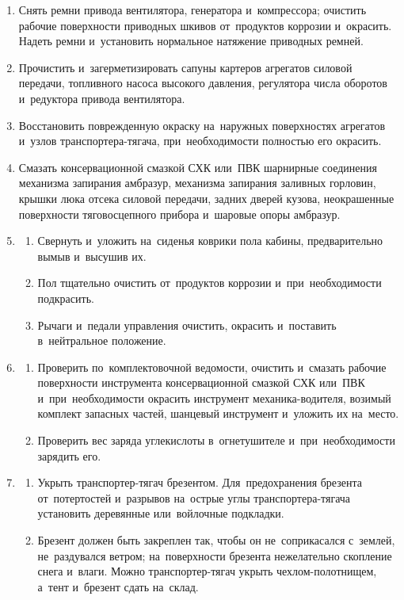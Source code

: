 \begin{enumerate}
    \item
    Снять ремни привода вентилятора, генератора и~компрессора; очистить рабочие поверхности приводных шкивов от~продуктов коррозии и~окрасить. Надеть ремни и~установить нормальное натяжение приводных ремней. 

    \item
    Прочистить и~загерметизировать сапуны картеров агрегатов силовой передачи, топливного насоса высокого давления, регулятора числа оборотов и~редуктора привода вентилятора. 

    \item
    Восстановить поврежденную окраску на~наружных поверхностях агрегатов и~узлов транспортера-тягача, при~необходимости полностью его окрасить. 

    \item
    Смазать консервационной смазкой СХК или~ПВК шарнирные соединения механизма запирания амбразур, механизма запирания заливных горловин, крышки люка отсека силовой передачи, задних дверей кузова, неокрашенные поверхности тяговосцепного прибора и~шаровые опоры амбразур. 

    \item \begin{enumerate}
        \item 
        Свернуть и~уложить на~сиденья коврики пола кабины, предварительно вымыв и~высушив их. 
        \item 
        Пол тщательно очистить от~продуктов коррозии и~при~необходимости подкрасить. 
        \item 
        Рычаги и~педали управления очистить, окрасить и~поставить в~нейтральное положение. 
    \end{enumerate}

    \item \begin{enumerate}
        \item 
        Проверить по~комплектовочной ведомости, очистить и~смазать рабочие поверхности инструмента консервационной смазкой СХК или~ПВК и~при~необходимости окрасить инструмент механика-водителя, возимый комплект запасных частей, шанцевый инструмент и~уложить их на~место. 
        \item 
        Проверить вес заряда углекислоты в~огнетушителе и~при~необходимости зарядить его. 
    \end{enumerate}

    \item \begin{enumerate}
        \item 
        Укрыть транспортер-тягач брезентом. Для~предохранения брезента от~потертостей и~разрывов на~острые углы транспортера-тягача установить деревянные или~войлочные подкладки. 
        \item 
        Брезент должен быть закреплен так, чтобы он не~соприкасался с~землей, не~раздувался ветром; на~поверхности брезента нежелательно скопление снега и~влаги. Можно транспортер-тягач укрыть чехлом-полотнищем, а~тент и~брезент сдать на~склад. 
    \end{enumerate}


\end{enumerate}
